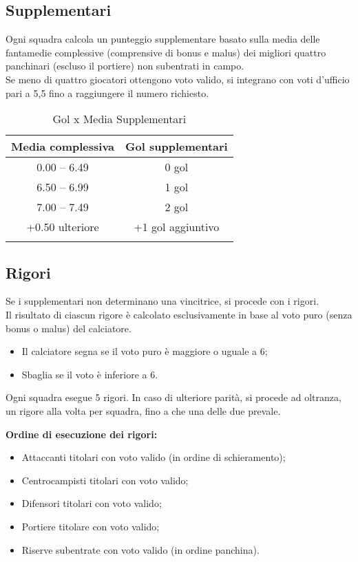 \subsection{Supplementari}
\label{art:8.4.1}

Ogni squadra calcola un punteggio supplementare basato sulla media delle fantamedie complessive (comprensive di bonus e malus) dei migliori quattro panchinari (escluso il portiere) non subentrati in campo.\\
Se meno di quattro giocatori ottengono voto valido, si integrano con voti d’ufficio pari a 5,5 fino a raggiungere il numero richiesto.

\begin{longtable}{|c|c|}
  \hline
  \textbf{Media complessiva} & \textbf{Gol supplementari} \\
  \hline
  0.00 -- 6.49 & 0 gol \\ \hline
  6.50 -- 6.99 & 1 gol \\ \hline
  7.00 -- 7.49 & 2 gol \\ \hline
  +0.50 ulteriore & +1 gol aggiuntivo \\
  \hline

  \caption{Gol x Media Supplementari}
\end{longtable}

\subsection{Rigori}
\label{art:8.4.2}

Se i supplementari non determinano una vincitrice, si procede con i rigori.\\
Il risultato di ciascun rigore è calcolato esclusivamente in base al voto puro (senza bonus o malus) del calciatore.

\begin{itemize}
  \item Il calciatore segna se il voto puro è maggiore o uguale a 6;
  \item Sbaglia se il voto è inferiore a 6.
\end{itemize}

Ogni squadra esegue 5 rigori. In caso di ulteriore parità, si procede ad oltranza, un rigore alla volta per squadra, fino a che una delle due prevale.

\noindent \textbf{Ordine di esecuzione dei rigori:}
\begin{itemize}
  \item Attaccanti titolari con voto valido (in ordine di schieramento);
  \item Centrocampisti titolari con voto valido;
  \item Difensori titolari con voto valido;
  \item Portiere titolare con voto valido;
  \item Riserve subentrate con voto valido (in ordine panchina).
\end{itemize}


